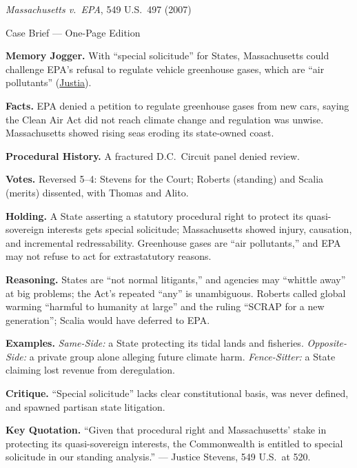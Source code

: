 \documentclass[12pt]{article}
\begin{document}
\begin{center}
{\Large \textit{Massachusetts v.\ EPA}, 549 U.S.\ 497 (2007)\par}
\vspace{0.3em}
{\normalsize Case Brief --- One-Page Edition\par}
\end{center}

\textbf{Memory Jogger.} With ``special solicitude'' for States, Massachusetts could challenge EPA's refusal to regulate vehicle greenhouse gases, which are ``air pollutants'' (\href{https://supreme.justia.com/cases/federal/us/549/497/}{Justia}).

\textbf{Facts.} EPA denied a petition to regulate greenhouse gases from new cars, saying the Clean Air Act did not reach climate change and regulation was unwise. Massachusetts showed rising seas eroding its state-owned coast.

\textbf{Procedural History.} A fractured D.C.\ Circuit panel denied review.

\textbf{Votes.} Reversed 5--4: Stevens for the Court; Roberts (standing) and Scalia (merits) dissented, with Thomas and Alito.

\textbf{Holding.} A State asserting a statutory procedural right to protect its quasi-sovereign interests gets special solicitude; Massachusetts showed injury, causation, and incremental redressability. Greenhouse gases are ``air pollutants,'' and EPA may not refuse to act for extrastatutory reasons.

\textbf{Reasoning.} States are ``not normal litigants,'' and agencies may ``whittle away'' at big problems; the Act's repeated ``any'' is unambiguous. Roberts called global warming ``harmful to humanity at large'' and the ruling ``SCRAP for a new generation''; Scalia would have deferred to EPA.

\textbf{Examples.} \emph{Same-Side:} a State protecting its tidal lands and fisheries. \emph{Opposite-Side:} a private group alone alleging future climate harm. \emph{Fence-Sitter:} a State claiming lost revenue from deregulation.

\textbf{Critique.} ``Special solicitude'' lacks clear constitutional basis, was never defined, and spawned partisan state litigation.

\textbf{Key Quotation.} ``Given that procedural right and Massachusetts' stake in protecting its quasi-sovereign interests, the Commonwealth is entitled to special solicitude in our standing analysis.'' --- Justice Stevens, 549 U.S.\ at 520.
\end{document}
